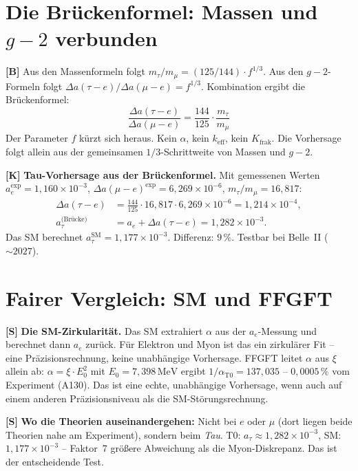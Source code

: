 \section{Die Brückenformel: Massen und \texorpdfstring{$g-2$}{g-2} verbunden}

\textbf{[B]} Aus den Massenformeln folgt $m_\tau/m_\mu=(125/144)\cdot f^{1/3}$.
Aus den $g-2$-Formeln folgt $\Delta a(\tau-e)/\Delta a(\mu-e)=f^{1/3}$.
Kombination ergibt die Brückenformel:
\[
  \boxed{\;\frac{\Delta a(\tau-e)}{\Delta a(\mu-e)} = \frac{144}{125}\cdot\frac{m_\tau}{m_\mu}\;}
\]
Der Parameter $f$ kürzt sich heraus. Kein $\alpha$, kein $k_\text{eff}$,
kein $K_\text{frak}$. Die Vorhersage folgt allein aus der gemeinsamen
$1/3$-Schrittweite von Massen und $g-2$.

\textbf{[K]} \textbf{Tau-Vorhersage aus der Brückenformel.} Mit gemessenen
Werten $a_e^\text{exp}=1{,}160\times10^{-3}$,
$\Delta a(\mu-e)^\text{exp}=6{,}269\times10^{-6}$,
$m_\tau/m_\mu=16{,}817$:
\begin{align*}
  \Delta a(\tau-e) &= \frac{144}{125}\cdot16{,}817\cdot6{,}269\times10^{-6}
  = 1{,}214\times10^{-4},\\
  a_\tau^\text{(Brücke)} &= a_e + \Delta a(\tau-e)
  = \boxed{1{,}282\times10^{-3}}.
\end{align*}
Das SM berechnet $a_\tau^\text{SM}=1{,}177\times10^{-3}$. Differenz: $9\,\%$.
Testbar bei Belle~II ($\sim2027$).

\section{Fairer Vergleich: SM und FFGFT}

\textbf{[S]} \textbf{Die SM-Zirkularität.} Das SM extrahiert $\alpha$ aus der
$a_e$-Messung und berechnet dann $a_e$ zurück. Für Elektron und Myon ist das
ein zirkulärer Fit -- eine Präzisionsrechnung, keine unabhängige Vorhersage.
FFGFT leitet $\alpha$ aus $\xi$ allein ab: $\alpha=\xi\cdot E_0^2$ mit
$E_0=7{,}398\,\text{MeV}$ ergibt $1/\alpha_\text{T0}=137{,}035$ --
$0{,}0005\,\%$ vom Experiment (A130). Das ist eine echte, unabhängige Vorhersage,
wenn auch auf einem anderen Präzisionsniveau als die SM-Störungsrechnung.

\textbf{[S]} \textbf{Wo die Theorien auseinandergehen:} Nicht bei $e$ oder $\mu$
(dort liegen beide Theorien nahe am Experiment), sondern beim \emph{Tau}. T0:
$a_\tau\approx1{,}282\times10^{-3}$, SM: $1{,}177\times10^{-3}$ -- Faktor~7
größere Abweichung als die Myon-Diskrepanz. Das ist der entscheidende Test.

